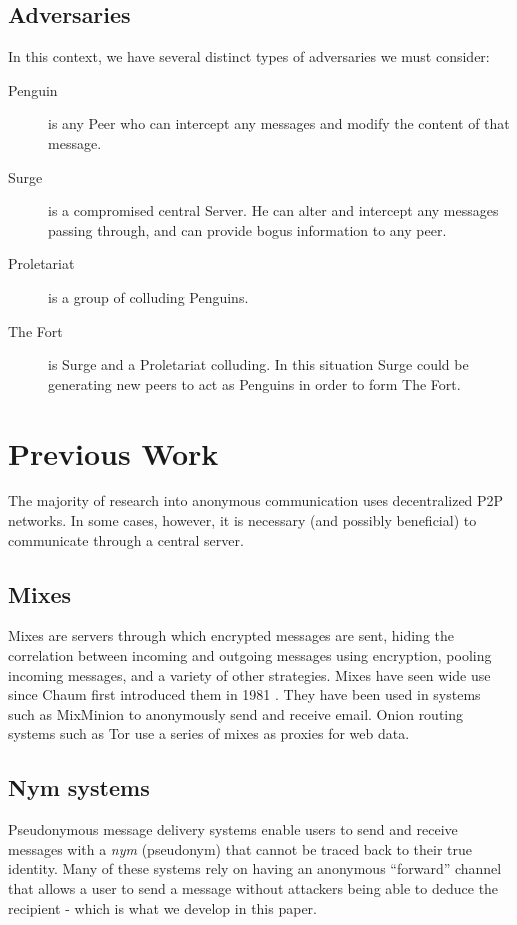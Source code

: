 \documentclass[twocolumn,11pt,english]{article}
\begin{document}
\subsection{Adversaries}
In this context, we have several distinct types of adversaries we must consider:
\begin{description}
\item[Penguin] 
  is any Peer who can intercept any messages and modify the content of that message.
\item[Surge] 
  is a compromised central Server. He can alter and intercept any messages passing through, and can provide bogus information to any peer.
\item[Proletariat] 
  is a group of colluding Penguins.
\item[The Fort] 
  is Surge and a Proletariat colluding. In this situation Surge could be generating new peers to act as Penguins in order to form The Fort.
\end{description}

\section{Previous Work}
The majority of research into anonymous communication uses decentralized P2P networks. In some cases, however, it is necessary (and possibly beneficial) to communicate through a central server. 

\subsection{Mixes}
Mixes are servers through which encrypted messages are sent, hiding the correlation between incoming and outgoing messages using encryption, pooling incoming messages, and a variety of other strategies. Mixes have seen wide use since Chaum first introduced them in 1981 \cite{chaum-mix}. They have been used in systems such as MixMinion\cite{minion-design} to anonymously send and receive email. Onion routing systems such as Tor \cite{tor-design} use a series of mixes as proxies for web data. 

\subsection{Nym systems} Pseudonymous message delivery systems enable users to send and receive messages with a \textit{nym} (pseudonym) that cannot be traced back to their true identity. Many of these systems rely on having an anonymous ``forward'' channel that allows a user to send a message without attackers being able to deduce the recipient - which is what we develop in this paper. 
\end{document}
